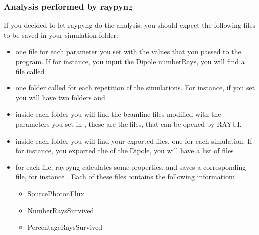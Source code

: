 \documentclass[letterpaper,10pt,english]{sphinxmanual}
\begin{document}
\subsubsection{Analysis performed by raypyng}
\label{\detokenize{tutorial:analysis-performed-by-raypyng}}
\sphinxAtStartPar
If you decided to let raypyng do the analysis, you should expect the following files to
be saved in your simulation folder:
\begin{itemize}
\item {} 
\sphinxAtStartPar
one file for each parameter you set with the values that you passed to the program.
If for instance, you input the Dipole numberRays, you will find a file called

\item {} 
\sphinxAtStartPar
one folder called  for each repetition of the simulations.
For instance, if you set  you will have two folders  and 

\item {} 
\sphinxAtStartPar
inside each  folder you will find the beamline files modified with the parameters
you set in , these are the  files, that can be opened by RAY\sphinxhyphen{}UI.

\item {} 
\sphinxAtStartPar
inside each  folder you will find your exported files, one for each simulation.
If for instance, you exported the  of the Dipole, you will
have a list of files 

\item {} 
\sphinxAtStartPar
for each  file, raypyng calculates some properties,
and saves a corresponding file, for instance . Each of these files contains the following information:
\begin{itemize}
\item {} 
\sphinxAtStartPar
SourcePhotonFlux

\item {} 
\sphinxAtStartPar
NumberRaysSurvived

\item {} 
\sphinxAtStartPar
PercentageRaysSurvived


\end{itemize}
\end{itemize}
\end{document}
